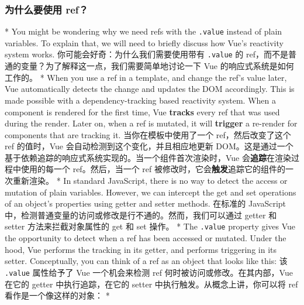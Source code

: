 \begin{paracol}{2}
\subsubsection{为什么要使用 ref？}
\switchcolumn[0]*%
You might be wondering why we need refs with the \texttt{.value} instead
of plain variables. To explain that, we will need to briefly discuss how
Vue's reactivity system works.
\switchcolumn
你可能会好奇：为什么我们需要使用带有 \texttt{.value} 的
ref，而不是普通的变量？为了解释这一点，我们需要简单地讨论一下 Vue
的响应式系统是如何工作的。
\switchcolumn[0]*%
When you use a ref in a template, and change the ref's value later, Vue
automatically detects the change and updates the DOM accordingly. This
is made possible with a dependency-tracking based reactivity system.
When a component is rendered for the first time, Vue \textbf{tracks}
every ref that was used during the render. Later on, when a ref is
mutated, it will \textbf{trigger} a re-render for components that are
tracking it.
\switchcolumn
当你在模板中使用了一个 ref，然后改变了这个 ref 的值时，Vue
会自动检测到这个变化，并且相应地更新
DOM。这是通过一个基于依赖追踪的响应式系统实现的。当一个组件首次渲染时，Vue
会\textbf{追踪}在渲染过程中使用的每一个 ref。然后，当一个 ref
被修改时，它会\textbf{触发}追踪它的组件的一次重新渲染。
\switchcolumn[0]*%
In standard JavaScript, there is no way to detect the access or mutation
of plain variables. However, we can intercept the get and set operations
of an object's properties using getter and setter methods.
\switchcolumn
在标准的 JavaScript
中，检测普通变量的访问或修改是行不通的。然而，我们可以通过 getter 和
setter 方法来拦截对象属性的 get 和 set 操作。
\switchcolumn[0]*%
The \texttt{.value} property gives Vue the opportunity to detect when a
ref has been accessed or mutated. Under the hood, Vue performs the
tracking in its getter, and performs triggering in its setter.
Conceptually, you can think of a ref as an object that looks like this:
\switchcolumn
该 \texttt{.value} 属性给予了 Vue 一个机会来检测 ref
何时被访问或修改。在其内部，Vue 在它的 getter 中执行追踪，在它的 setter
中执行触发。从概念上讲，你可以将 ref 看作是一个像这样的对象：
\switchcolumn[0]*%
\begin{codeJs}
%
\end{codeJs}
\switchcolumn
\begin{codeJs}
%
\end{codeJs}

\end{paracol}




